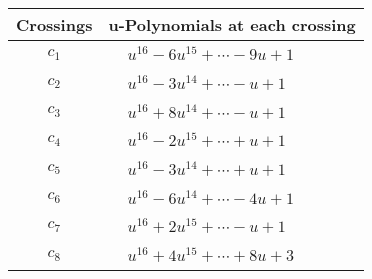 \documentclass[1p]{elsarticle_modified}
\theoremstyle{definition}
\begin{document}
\begin{tabular}{m{50pt}|m{274pt}}
Crossings & \hspace{64pt}u-Polynomials at each crossing \\
\hline $$\begin{aligned}c_{1}\end{aligned}$$&$\begin{aligned}
&u^{16}-6 u^{15}+\cdots-9 u+1
\end{aligned}$\\
\hline $$\begin{aligned}c_{2}\end{aligned}$$&$\begin{aligned}
&u^{16}-3 u^{14}+\cdots- u+1
\end{aligned}$\\
\hline $$\begin{aligned}c_{3}\end{aligned}$$&$\begin{aligned}
&u^{16}+8 u^{14}+\cdots- u+1
\end{aligned}$\\
\hline $$\begin{aligned}c_{4}\end{aligned}$$&$\begin{aligned}
&u^{16}-2 u^{15}+\cdots+u+1
\end{aligned}$\\
\hline $$\begin{aligned}c_{5}\end{aligned}$$&$\begin{aligned}
&u^{16}-3 u^{14}+\cdots+u+1
\end{aligned}$\\
\hline $$\begin{aligned}c_{6}\end{aligned}$$&$\begin{aligned}
&u^{16}-6 u^{14}+\cdots-4 u+1
\end{aligned}$\\
\hline $$\begin{aligned}c_{7}\end{aligned}$$&$\begin{aligned}
&u^{16}+2 u^{15}+\cdots- u+1
\end{aligned}$\\
\hline $$\begin{aligned}c_{8}\end{aligned}$$&$\begin{aligned}
&u^{16}+4 u^{15}+\cdots+8 u+3
\end{aligned}$\\

\end{tabular}
\end{document}
